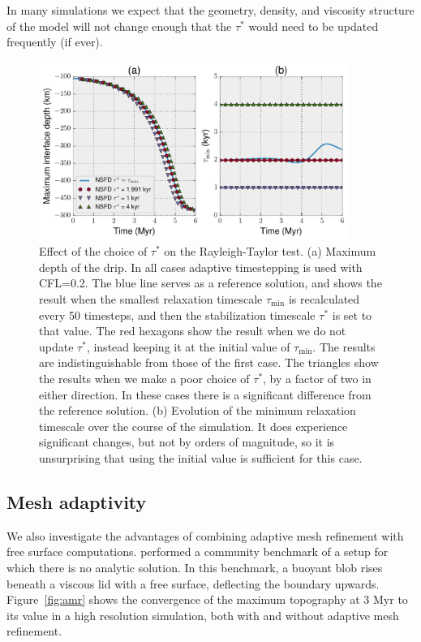 \documentclass[preprint,12pt,authoryear]{elsarticle}
\begin{document}
In many simulations we expect that the geometry, density, and viscosity structure of the model will not change
enough that the $\tau^*$ would need to be updated frequently (if ever).

\begin{figure}
\includegraphics[width=0.9\textwidth]{figures/rayleigh_taylor_tau_choice.pdf}
\caption{Effect of the choice of $\tau^*$ on the Rayleigh-Taylor test. (a) Maximum depth of the drip. In all cases adaptive timestepping is used with CFL=0.2. The blue line serves as a reference solution, and shows the result when the smallest relaxation timescale $\tau_{\mathrm{min}}$ is recalculated every 50 timesteps, and then the stabilization timescale $\tau^*$ is set to that value. The red hexagons show the result when we do not update $\tau^*$, instead keeping it at the initial value of $\tau_{\mathrm{min}}$. The results are indistinguishable from those of the first case. The triangles show the results when we make a poor choice of $\tau^*$, by a factor of two in either direction. In these cases there is a significant difference from the reference solution. (b) Evolution of the minimum relaxation timescale over the course of the simulation. It does experience significant changes, but not by orders of magnitude, so it is unsurprising that using the initial value is sufficient for this case.}
\label{fig:rayleigh_taylor_tau_choice}
\end{figure}


\subsection{Mesh adaptivity}
\label{sec:mesh_adaptivity}

We also investigate the advantages of combining adaptive mesh refinement with free surface computations.
\citet{crameri2012comparison} performed a community benchmark of a setup for which there is no analytic
solution. In this benchmark, a buoyant blob rises beneath a viscous lid with a free surface, deflecting the boundary upwards.
Figure~\ref{fig:amr} shows the convergence of the maximum topography at 3 Myr to its value in a high resolution simulation,
both with and without adaptive mesh refinement.
\end{document}
